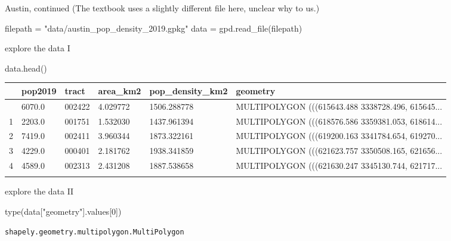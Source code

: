 \documentclass[
  ignorenonframetext,
]{beamer}
\newenvironment{Shaded}{\begin{snugshade}}{\end{snugshade}}
\newcommand{\BuiltInTok}[1]{\textcolor[rgb]{0.00,0.23,0.31}{#1}}
\newcommand{\DecValTok}[1]{\textcolor[rgb]{0.68,0.00,0.00}{#1}}
\newcommand{\NormalTok}[1]{\textcolor[rgb]{0.00,0.23,0.31}{#1}}
\newcommand{\OperatorTok}[1]{\textcolor[rgb]{0.37,0.37,0.37}{#1}}
\newcommand{\StringTok}[1]{\textcolor[rgb]{0.13,0.47,0.30}{#1}}
\begin{document}
\begin{frame}[fragile]{Austin, continued}
\label{austin-continued}
(The textbook uses a slightly different file here, unclear why to us.)

\begin{Shaded}
\begin{Highlighting}[]
\NormalTok{filepath }\OperatorTok{=} \StringTok{"data/austin\_pop\_density\_2019.gpkg"}
\NormalTok{data }\OperatorTok{=}\NormalTok{ gpd.read\_file(filepath)}
\end{Highlighting}
\end{Shaded}
\end{frame}

\begin{frame}[fragile]{explore the data I}
\label{explore-the-data-i}
\begin{Shaded}
\begin{Highlighting}[]
\NormalTok{data.head()}
\end{Highlighting}
\end{Shaded}

\begin{longtable}[]{@{}llllll@{}}
\toprule\noalign{}
& pop2019 & tract & area\_km2 & pop\_density\_km2 & geometry \\
\midrule\noalign{}
\endhead
0 & 6070.0 & 002422 & 4.029772 & 1506.288778 & MULTIPOLYGON
(((615643.488 3338728.496, 615645... \\
1 & 2203.0 & 001751 & 1.532030 & 1437.961394 & MULTIPOLYGON
(((618576.586 3359381.053, 618614... \\
2 & 7419.0 & 002411 & 3.960344 & 1873.322161 & MULTIPOLYGON
(((619200.163 3341784.654, 619270... \\
3 & 4229.0 & 000401 & 2.181762 & 1938.341859 & MULTIPOLYGON
(((621623.757 3350508.165, 621656... \\
4 & 4589.0 & 002313 & 2.431208 & 1887.538658 & MULTIPOLYGON
(((621630.247 3345130.744, 621717... \\
\bottomrule\noalign{}
\end{longtable}
\end{frame}

\begin{frame}[fragile]{explore the data II}
\label{explore-the-data-ii}
\begin{Shaded}
\begin{Highlighting}[]
\BuiltInTok{type}\NormalTok{(data[}\StringTok{"geometry"}\NormalTok{].values[}\DecValTok{0}\NormalTok{])}
\end{Highlighting}
\end{Shaded}

\begin{verbatim}
shapely.geometry.multipolygon.MultiPolygon
\end{verbatim}
\end{frame}
\end{document}
